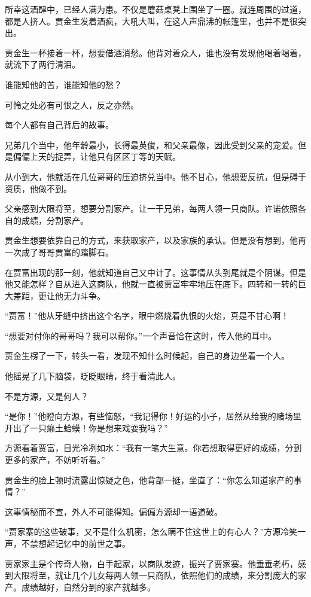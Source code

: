 \begin{this_body}
所幸这酒肆中，已经人满为患。不仅是蘑菇桌凳上围坐了一圈。就连周围的过道，都是人挤人。贾金生发着酒疯，大吼大叫，在这人声鼎沸的帐篷里，也并不是很突出。

贾金生一杯接着一杯，想要借酒消愁。他背对着众人，谁也没有发现他喝着喝着，就流下了两行清泪。

谁能知他的苦，谁能知他的愁？

可怜之处必有可恨之人，反之亦然。

每个人都有自己背后的故事。

兄弟几个当中，他年龄最小，长得最英俊，和父亲最像，因此受到父亲的宠爱。但是偏偏上天的捉弄，让他只有区区丁等的天赋。

从小到大，他就活在几位哥哥的压迫挤兑当中。他不甘心，他想要反抗，但是碍于资质，他做不到。

父亲感到大限将至，想要分割家产。让一干兄弟，每两人领一只商队。许诺依照各自的成绩，分割家产。

贾金生想要依靠自己的方式，来获取家产，以及家族的承认。但是没有想到，他再一次成了哥哥贾富的踏脚石。

在贾富出现的那一刻，他就知道自己又中计了。这事情从头到尾就是个阴谋。但是他又能怎样？自从进入这商队，他就一直被贾富牢牢地压在底下。四转和一转的巨大差距，更让他无力斗争。

“贾富！”他从牙缝中挤出这个名字，眼中燃烧着仇恨的火焰，真是不甘心啊！

“想要对付你的哥哥吗？我可以帮你。”一个声音恰在这时，传入他的耳中。

贾金生楞了一下，转头一看，发现不知什么时候起，自己的身边坐着一个人。

他摇晃了几下脑袋，眨眨眼睛，终于看清此人。

不是方源，又是何人？

“是你！”他瞪向方源，有些恼怒，“我记得你！好运的小子，居然从给我的赌场里开出了一只癞土蛤蟆！你是想来戏耍我吗？”

方源看着贾富，目光冷冽如水：“我有一笔大生意。你若想取得更好的成绩，分到更多的家产，不妨听听看。”

贾金生的脸上顿时流露出惊疑之色，他背部一挺，坐直了：“你怎么知道家产的事情？”

这事情秘而不宣，外人不可能得知。偏偏方源却一语道破。

“贾家寨的这些破事，又不是什么机密，怎么瞒不住这世上的有心人？”方源冷笑一声，不禁想起记忆中的前世之事。

贾家家主是个传奇人物，白手起家，以商队发迹，振兴了贾家寨。他垂垂老朽，感到大限将至，就让几个儿女每两人领一只商队，依照他们的成绩，来分割庞大的家产。成绩越好，自然分到的家产就越多。


\end{this_body}
